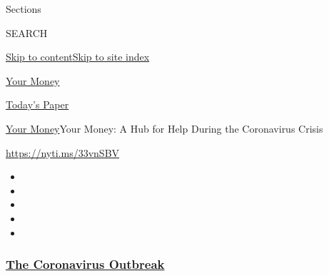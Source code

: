 Sections

SEARCH

\protect\hyperlink{site-content}{Skip to
content}\protect\hyperlink{site-index}{Skip to site index}

\href{https://www.nytimes3xbfgragh.onion/section/your-money}{Your Money}

\href{https://myaccount.nytimes3xbfgragh.onion/auth/login?response_type=cookie\&client_id=vi}{}

\href{https://www.nytimes3xbfgragh.onion/section/todayspaper}{Today's
Paper}

\href{/section/your-money}{Your Money}\textbar{}Your Money: A Hub for
Help During the Coronavirus Crisis

\url{https://nyti.ms/33vnSBV}

\begin{itemize}
\item
\item
\item
\item
\item
\end{itemize}

\hypertarget{the-coronavirus-outbreak}{%
\subsubsection{\texorpdfstring{\href{https://www.nytimes3xbfgragh.onion/news-event/coronavirus?name=styln-coronavirus\&region=TOP_BANNER\&variant=undefined\&block=storyline_menu_recirc\&action=click\&pgtype=Article\&impression_id=6d6bc090-e392-11ea-bdca-c743cc6a6463}{The
Coronavirus
Outbreak}}{The Coronavirus Outbreak}}\label{the-coronavirus-outbreak}}

